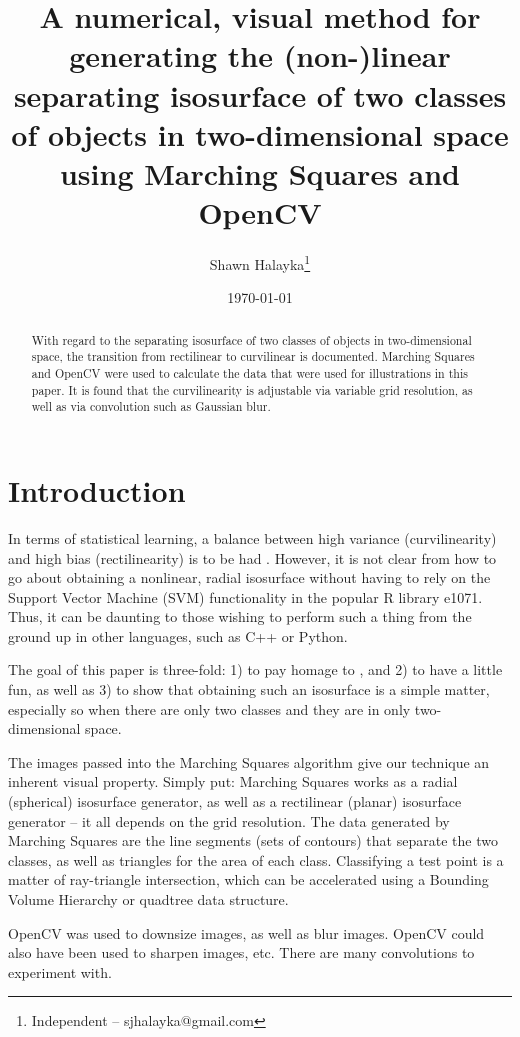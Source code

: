\documentclass[12pt]{article}
\title{A numerical, visual method for generating the (non-)linear separating isosurface of two classes of objects in two-dimensional space using Marching Squares and OpenCV}
\author{
Shawn Halayka\footnote{Independent -- sjhalayka@gmail.com}
}
\date{\today\;\currenttime}
\begin{document}
\maketitle

\begin{abstract}
With regard to the separating isosurface of two classes of objects in two-dimensional space, the transition from rectilinear to curvilinear is documented.
Marching Squares and OpenCV were used to calculate the data that were used for illustrations in this paper.
It is found that the curvilinearity is adjustable via variable grid resolution, as well as via convolution such as Gaussian blur.
\end{abstract}




\section{Introduction}

In terms of statistical learning, a balance between high variance (curvilinearity) and high bias (rectilinearity) is to be had \cite{james}.
However, it is not clear from \cite{james} how to go about obtaining a nonlinear, radial isosurface without having to rely on the Support Vector Machine (SVM) functionality in the popular R library e1071.
Thus, it can be daunting to those wishing to perform such a thing from the ground up in other languages, such as C++ or Python.

The goal of this paper is three-fold: 1) to pay homage to \cite{james}, and 2) to have a little fun, as well as 3) to show that obtaining such an isosurface is a simple matter, especially so when there are only two classes and they are in only two-dimensional space.

The images passed into the Marching Squares algorithm give our technique an inherent visual property.
Simply put: Marching Squares \cite{halayka, gong, bobrowski} works as a radial (spherical) isosurface generator, as well as a rectilinear (planar) isosurface generator -- it all depends on the grid resolution.
The data generated by Marching Squares are the line segments (sets of contours) that separate the two classes, as well as triangles for the area of each class.
Classifying a test point is a matter of ray-triangle intersection, which can be accelerated using a Bounding Volume Hierarchy or quadtree data structure.

OpenCV \cite{opencv} was used to downsize images, as well as blur images.
OpenCV could also have been used to sharpen images, etc.
There are many convolutions to experiment with.
\end{document}

